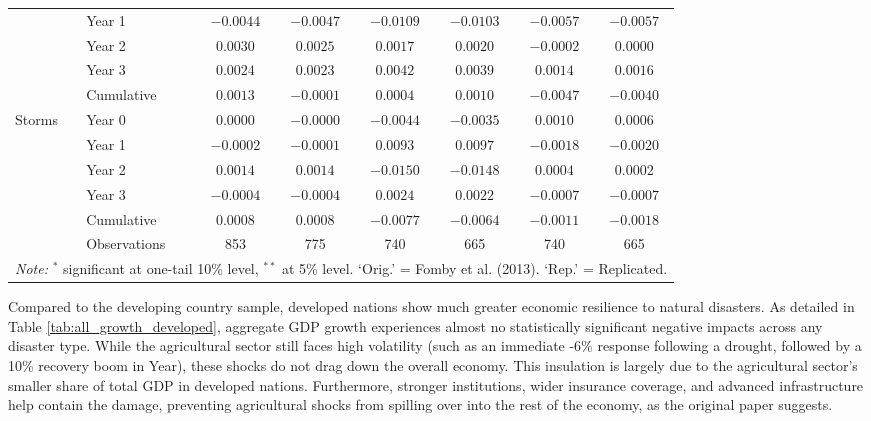 \documentclass[11pt, a4paper]{article}
\begin{document}
\begin{table}[H]
{\begin{tabular}{llcccccc}
                    & Year 1            & $-0.0044$ & $-0.0047$ & $-0.0109$      & $-0.0103$      & $-0.0057$ & $-0.0057$ \\
                    & Year 2            & $0.0030$  & $0.0025$  & $0.0017$       & $0.0020$       & $-0.0002$ & $0.0000$ \\
                    & Year 3            & $0.0024$  & $0.0023$  & $0.0042$       & $0.0039$       & $0.0014$  & $0.0016$ \\
                    & Cumulative        & $0.0013$  & $-0.0001$ & $0.0004$       & $0.0010$       & $-0.0047$ & $-0.0040$ \\
        [0.5ex]
        Storms      & Year 0            & $0.0000$  & $-0.0000$ & $-0.0044$      & $-0.0035$      & $0.0010$  & $0.0006$ \\
                    & Year 1            & $-0.0002$ & $-0.0001$ & $0.0093$       & $0.0097$       & $-0.0018$ & $-0.0020$ \\
                    & Year 2            & $0.0014$  & $0.0014$  & $-0.0150$      & $-0.0148$      & $0.0004$  & $0.0002$ \\
                    & Year 3            & $-0.0004$ & $-0.0004$ & $0.0024$       & $0.0022$       & $-0.0007$ & $-0.0007$ \\
                    & Cumulative        & $0.0008$  & $0.0008$  & $-0.0077$      & $-0.0064$      & $-0.0011$ & $-0.0018$ \\
        \midrule
                    & Observations &   853    &   775    & 740   & 665               & 740       & 665 \\
        \bottomrule
        \multicolumn{8}{l}{\scriptsize \textit{Note:} $^{*}$ significant at one-tail 10\% level, $^{**}$ at 5\% level. `Orig.' = Fomby et al. (2013). `Rep.' = Replicated.}
    \end{tabular}
    }
\end{table}

Compared to the developing country sample, developed nations show much greater economic resilience to natural disasters. As detailed in Table \ref{tab:all_growth_developed}, aggregate GDP growth experiences almost no statistically significant negative impacts across any disaster type. While the agricultural sector still faces high volatility (such as an immediate -6\% response following a drought, followed by a 10\% recovery boom in Year), these shocks do not drag down the overall economy. This insulation is largely due to the agricultural sector's smaller share of total GDP in developed nations. Furthermore, stronger institutions, wider insurance coverage, and advanced infrastructure help contain the damage, preventing agricultural shocks from spilling over into the rest of the economy, as the original paper suggests.
\end{document}
